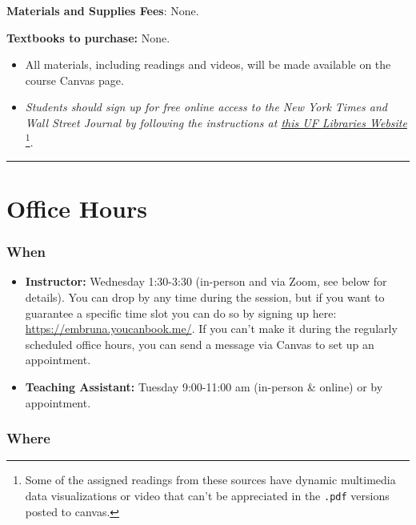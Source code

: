 \documentclass[
  10pt,
  letterpaper,
  oneside,
  open=any]{scrbook}
\begin{document}
\textbf{Materials and Supplies Fees}: None.

\textbf{Textbooks to purchase:} None.

\begin{itemize}
\item
  All materials, including readings and videos, will be made available
  on the course Canvas page. \bigskip
\item
  \emph{Students should sign up for free online access to the New York
  Times and Wall Street Journal by following the instructions at
  \href{https://businesslibrary.uflib.ufl.edu/c.php?g=943928&p=7708734}{this
  UF Libraries Website}} \footnote{Some of the assigned readings from
    these sources have dynamic multimedia data visualizations or video
    that can't be appreciated in the \texttt{.pdf} versions posted to
    canvas.}.
\end{itemize}

\begin{center}\rule{0.5\linewidth}{0.5pt}\end{center}


\chapter{Office Hours}\label{office-hours}

\subsection*{When}\label{when}

\begin{itemize}
\item
  \textbf{Instructor:} Wednesday 1:30-3:30 (in-person and via Zoom, see
  below for details). You can drop by any time during the session, but
  if you want to guarantee a specific time slot you can do so by signing
  up here: \url{https://embruna.youcanbook.me/}. If you can't make it
  during the regularly scheduled office hours, you can send a message
  via Canvas to set up an appointment.
\item
  \textbf{Teaching Assistant:} Tuesday 9:00-11:00 am (in-person \&
  online) or by appointment.
\end{itemize}

\subsection*{Where}\label{where}
\end{document}
